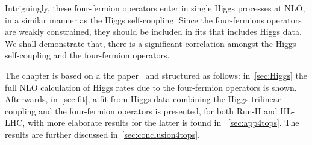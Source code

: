 \par Intriguingly, these  four-fermion operators enter in single Higgs processes at NLO, in a similar manner as the Higgs self-coupling. Since the four-fermions operators are weakly constrained, they should be included in fits that includes Higgs data. We shall demonstrate that, there is a significant correlation amongst the Higgs self-coupling and the four-fermion operators.
\par 
The chapter is based on a the paper~\cite{Alasfar:2022zyr} and structured as follows: in~\autoref{sec:Higgs} the full NLO calculation of Higgs rates due to the four-fermion operators is shown. Afterwards, in~\autoref{sec:fit}, a fit from Higgs data combining the Higgs trilinear coupling and the four-fermion operators is presented, for both Run-II and HL-LHC, with more elaborate results for the latter is found in ~\autoref{sec:app4tops}. The results are further discussed in~\autoref{sec:conclusion4tops}.
